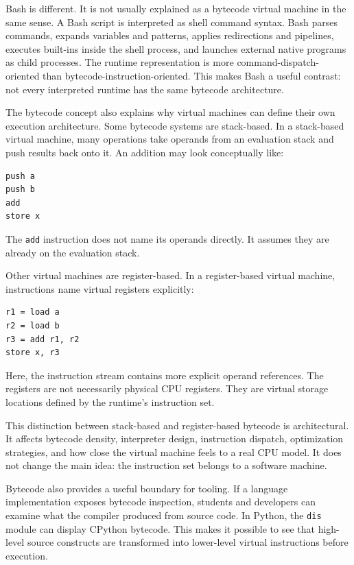 \documentclass[a4paper,twoside]{report}
\begin{document}
Bash is different. It is not usually explained as a bytecode virtual machine in the same sense. A Bash script is interpreted as shell command syntax. Bash parses commands, expands variables and patterns, applies redirections and pipelines, executes built-ins inside the shell process, and launches external native programs as child processes. The runtime representation is more command-dispatch-oriented than bytecode-instruction-oriented. This makes Bash a useful contrast: not every interpreted runtime has the same bytecode architecture.

The bytecode concept also explains why virtual machines can define their own execution architecture. Some bytecode systems are stack-based. In a stack-based virtual machine, many operations take operands from an evaluation stack and push results back onto it. An addition may look conceptually like:

\begin{verbatim}
push a
push b
add
store x
\end{verbatim}

The \texttt{add} instruction does not name its operands directly. It assumes they are already on the evaluation stack.

Other virtual machines are register-based. In a register-based virtual machine, instructions name virtual registers explicitly:

\begin{verbatim}
r1 = load a
r2 = load b
r3 = add r1, r2
store x, r3
\end{verbatim}

Here, the instruction stream contains more explicit operand references. The registers are not necessarily physical CPU registers. They are virtual storage locations defined by the runtime's instruction set.

This distinction between stack-based and register-based bytecode is architectural. It affects bytecode density, interpreter design, instruction dispatch, optimization strategies, and how close the virtual machine feels to a real CPU model. It does not change the main idea: the instruction set belongs to a software machine.

Bytecode also provides a useful boundary for tooling. If a language implementation exposes bytecode inspection, students and developers can examine what the compiler produced from source code. In Python, the \texttt{dis} module can display CPython bytecode. This makes it possible to see that high-level source constructs are transformed into lower-level virtual instructions before execution.
\end{document}
